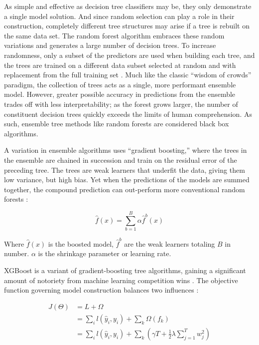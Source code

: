As simple and effective as decision tree classifiers may be, they only demonstrate a single model solution. And since random selection can play a role in their construction, completely different tree structures may arise if a tree is rebuilt on the same data set. The random forest algorithm embraces these random variations and generates a large number of decision trees. To increase randomness, only a subset of the predictors are used when building each tree, and the trees are trained on a different data subset selected at random and with replacement from the full training set \citep[p. 376--377]{bertsimas_analytics_2016}. Much like the classic “wisdom of crowds” paradigm, the collection of trees acts as a single, more performant ensemble model. However, greater possible accuracy in predictions from the ensemble trades off with less interpretability; as the forest grows larger, the number of constituent decision trees quickly exceeds the limits of human comprehension. As such, ensemble tree methods like random forests are considered black box algorithms.

A variation in ensemble algorithms uses “gradient boosting,” where the trees in the ensemble are chained in succession and train on the residual error of the preceding tree. The trees are weak learners that underfit the data, giving them low variance, but high bias. Yet when the predictions of the models are summed together, the compound prediction can out-perform more conventional random forests \citep[p. 323]{james_introduction_2013}:

\begin{equation}
\label{eq:xgb_form}
    \hat{f}(x) = \sum_{b=1}^{B}{\alpha \hat{f}^{b}(x)}
\end{equation}

Where $\hat{f}(x)$ is the boosted model, $\hat{f}^b$ are the weak learners totaling $B$ in number. $\alpha$ is the shrinkage parameter or learning rate. 

XGBoost is a variant of gradient-boosting tree algorithms, gaining a significant amount of notoriety from machine learning competition wins \citep{chen_dmlcxgboost_2021}. The objective function governing model construction balances two influences \citep{chen_xgboost_2016}:

\begin{equation}
\label{eq:xgb_objective}
\begin{aligned}
    J(\Theta) &= L + \Omega \\
    &= \sum_{i}{l(\hat{y}_i,y_i)}+\sum_{k}{\Omega(f_k)} \\
    &= \sum_{i}{l(\hat{y}_i,y_i)}+\sum_{k}{\left({\gamma T}+\frac{1}{2} \lambda \sum_{j=1}^T{w_j^2}\right)}
\end{aligned}
\end{equation}


